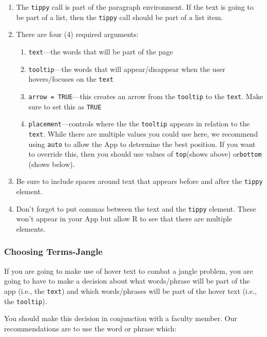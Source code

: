 \documentclass[
]{book}
\providecommand{\tightlist}{%
  \setlength{\itemsep}{0pt}\setlength{\parskip}{0pt}}
\begin{document}
\begin{enumerate}
\def\labelenumi{\arabic{enumi}.}
\tightlist
\item
  The \texttt{tippy} call is part of the paragraph environment. If the text is going to be part of a list, then the \texttt{tippy} call should be part of a list item.
\item
  There are four (4) required arguments:

  \begin{enumerate}
  \def\labelenumii{\alph{enumii}.}
  \tightlist
  \item
    \texttt{text}---the words that will be part of the page\\
  \item
    \texttt{tooltip}---the words that will appear/disappear when the user hovers/focuses on the \texttt{text}
  \item
    \texttt{arrow\ =\ TRUE}---this creates an arrow from the \texttt{tooltip} to the \texttt{text}. Make sure to set this as \texttt{TRUE}
  \item
    \texttt{placement}---controls where the the \texttt{tooltip} appears in relation to the \texttt{text}. While there are multiple values you could use here, we recommend using \texttt{auto} to allow the App to determine the best position. If you want to override this, then you should use values of \texttt{top}(shows above) or\texttt{bottom} (shows below).
  \end{enumerate}
\item
  Be sure to include spaces around text that appears before and after the \texttt{tippy} element.
\item
  Don't forget to put commas between the text and the \texttt{tippy} element. These won't appear in your App but allow R to see that there are multiple elements.
\end{enumerate}

\hypertarget{choosing-terms-jangle}{%
\subsubsection{Choosing Terms-Jangle}\label{choosing-terms-jangle}}

If you are going to make use of hover text to combat a jangle problem, you are going to have to make a decision about what words/phrase will be part of the app (i.e., the \texttt{text}) and which words/phrases will be part of the hover text (i.e., the \texttt{tooltip}).

You should make this decision in conjunction with a faculty member. Our recommendations are to use the word or phrase which:
\end{document}

